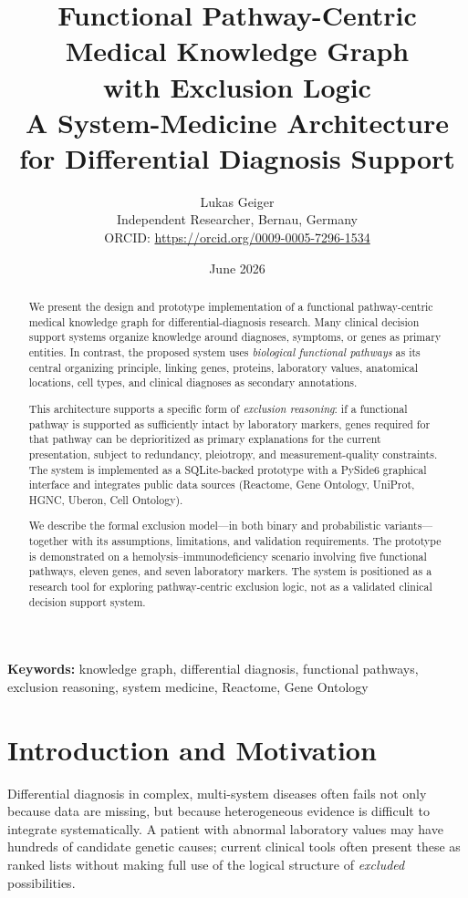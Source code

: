 \documentclass[12pt,a4paper]{article}
\title{%
    \textbf{Functional Pathway-Centric Medical Knowledge Graph\\
    with Exclusion Logic}\\[0.5em]
    \large A System-Medicine Architecture for Differential Diagnosis Support
}
\author{
    Lukas Geiger\\
    Independent Researcher, Bernau, Germany\\
    ORCID: \url{https://orcid.org/0009-0005-7296-1534}
}
\date{June 2026}
\begin{document}
\maketitle

\begin{abstract}
We present the design and prototype implementation of a functional pathway-centric medical knowledge graph for differential-diagnosis research. Many clinical decision support systems organize knowledge around diagnoses, symptoms, or genes as primary entities. In contrast, the proposed system uses \emph{biological functional pathways} as its central organizing principle, linking genes, proteins, laboratory values, anatomical locations, cell types, and clinical diagnoses as secondary annotations.

This architecture supports a specific form of \emph{exclusion reasoning}: if a functional pathway is supported as sufficiently intact by laboratory markers, genes required for that pathway can be deprioritized as primary explanations for the current presentation, subject to redundancy, pleiotropy, and measurement-quality constraints. The system is implemented as a SQLite-backed prototype with a PySide6 graphical interface and integrates public data sources (Reactome, Gene Ontology, UniProt, HGNC, Uberon, Cell Ontology).

We describe the formal exclusion model---in both binary and probabilistic variants---together with its assumptions, limitations, and validation requirements. The prototype is demonstrated on a hemolysis--immunodeficiency scenario involving five functional pathways, eleven genes, and seven laboratory markers. The system is positioned as a research tool for exploring pathway-centric exclusion logic, not as a validated clinical decision support system.
\end{abstract}

\smallskip
\noindent\textbf{Keywords:} knowledge graph, differential diagnosis, functional pathways, exclusion reasoning, system medicine, Reactome, Gene Ontology
\clearpage

\section{Introduction and Motivation}
\label{sec:introduction}

Differential diagnosis in complex, multi-system diseases often fails not only because data are missing, but because heterogeneous evidence is difficult to integrate systematically. A patient with abnormal laboratory values may have hundreds of candidate genetic causes; current clinical tools often present these as ranked lists without making full use of the logical structure of \emph{excluded} possibilities.
\end{document}
